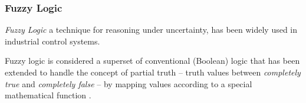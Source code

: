 %
%
%
%
%
%
%

\subsubsection{Fuzzy Logic}
\label{fuzzy_logic_heading}

\emph{Fuzzy Logic} a technique for reasoning under uncertainty, has been widely
used in industrial control systems. \cite{wikipedia}

Fuzzy logic is considered a superset of conventional (Boolean) logic that has
been extended to handle the concept of partial truth --
truth values between \emph{completely true} and \emph{completely false} -- by
mapping values according to a special mathematical function \cite{kantrowitz}.
